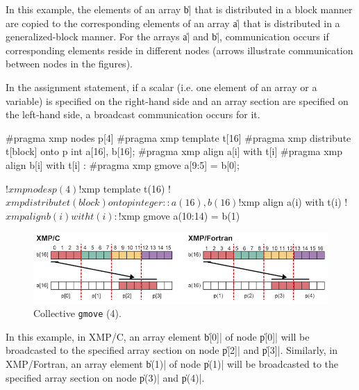 In this example, the elements of an array \|b| that is distributed in
a block manner are copied to the corresponding elements of an array \|a|
that is distributed in a generalized-block manner.
%
For the arrays \|a| and \|b|, communication occurs if corresponding elements
reside in different nodes (arrows illustrate communication between nodes in
the figures).


In the assignment statement, if a scalar (i.e. one element of an array or
a variable) is specified on the right-hand side and an array section are
specified on the left-hand side, a broadcast communication occurs for it.

\begin{XCexample}
#pragma xmp nodes p[4]
#pragma xmp template t[16]
#pragma xmp distribute t[block] onto p
int a[16], b[16];
#pragma xmp align a[i] with t[i]
#pragma xmp align b[i] with t[i]
     :
#pragma xmp gmove
  a[9:5] = b[0];
\end{XCexample}

\begin{XFexample}
!$xmp nodes p(4)
!$xmp template t(16)
!$xmp distribute t(block) onto p
integer :: a(16), b(16)
!$xmp align a(i) with t(i)
!$xmp align b(i) with t(i)
     :
!$xmp gmove
  a(10:14) = b(1)
\end{XFexample}

\begin{figure}
  \centering
  \includegraphics[width=\textwidth]{figs/gmove_one_element.png}
  \caption{Collective {\tt gmove} (4).}
\end{figure}

In this example, in XMP/C, an array element \|b[0]| of node \|p[0]| will be
broadcasted to the specified array section on node \|p[2]| and
\|p[3]|. Similarly, in XMP/Fortran, an array element \|b(1)| of node
\|p(1)| will be broadcasted to the specified array section on node \|p(3)| and \|p(4)|.


